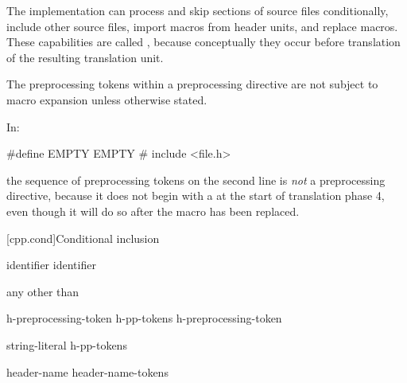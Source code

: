 \documentclass{wg21}
\begin{document}
\pnum
The implementation can
process and skip sections of source files conditionally,
include other source files,
import macros from header units,
and replace macros.
These capabilities are called
,
because conceptually they occur
before translation of the resulting translation unit.

\pnum
The preprocessing tokens within a preprocessing directive
are not subject to macro expansion unless otherwise stated.

\begin{example}
    In:
    \begin{codeblock}
        #define EMPTY
        EMPTY   #   include <file.h>
    \end{codeblock}
    the sequence of preprocessing tokens on the second line is \textit{not}
    a preprocessing directive, because it does not begin with a \tcode{\#} at the start of
    translation phase 4, even though it will do so after the macro 
    has been replaced.
\end{example}

[cpp.cond]{Conditional inclusion}%
%

%
\begin{bnf}
    \br
     identifier\br
     identifier \terminal{)}
\end{bnf}

\begin{bnf}
    \br
    \textnormal{any  other than \terminal{>}}
\end{bnf}

\begin{bnf}
    \br
    h-preprocessing-token\br
    h-pp-tokens h-preprocessing-token
\end{bnf}

\begin{bnf}
    \br
    string-literal\br
    \terminal{<} h-pp-tokens \terminal{>}
\end{bnf}

%
\begin{bnf}
    \br
     \terminal{(} header-name \terminal{)}\br
     \terminal{(} header-name-tokens \terminal{)}
\end{bnf}
\end{document}
